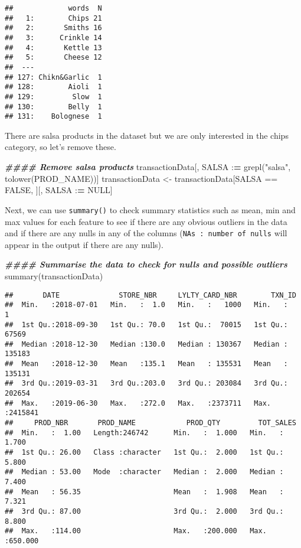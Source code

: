 \documentclass[
]{article}
\newenvironment{Shaded}{\begin{snugshade}}{\end{snugshade}}
\newcommand{\ConstantTok}[1]{\textcolor[rgb]{0.00,0.00,0.00}{#1}}
\newcommand{\DocumentationTok}[1]{\textcolor[rgb]{0.56,0.35,0.01}{\textbf{\textit{#1}}}}
\newcommand{\ErrorTok}[1]{\textcolor[rgb]{0.64,0.00,0.00}{\textbf{#1}}}
\newcommand{\FunctionTok}[1]{\textcolor[rgb]{0.00,0.00,0.00}{#1}}
\newcommand{\NormalTok}[1]{#1}
\newcommand{\OtherTok}[1]{\textcolor[rgb]{0.56,0.35,0.01}{#1}}
\newcommand{\SpecialCharTok}[1]{\textcolor[rgb]{0.00,0.00,0.00}{#1}}
\newcommand{\StringTok}[1]{\textcolor[rgb]{0.31,0.60,0.02}{#1}}
\begin{document}
\begin{verbatim}
##             words  N
##   1:        Chips 21
##   2:       Smiths 16
##   3:      Crinkle 14
##   4:       Kettle 13
##   5:       Cheese 12
##  ---                
## 127: Chikn&Garlic  1
## 128:        Aioli  1
## 129:         Slow  1
## 130:        Belly  1
## 131:    Bolognese  1
\end{verbatim}

There are salsa products in the dataset but we are only interested in
the chips category, so let's remove these.

\begin{Shaded}
\begin{Highlighting}[]
\DocumentationTok{\#\#\#\# Remove salsa products}
\NormalTok{transactionData[, SALSA }\SpecialCharTok{:}\ErrorTok{=} \FunctionTok{grepl}\NormalTok{(}\StringTok{"salsa"}\NormalTok{, }\FunctionTok{tolower}\NormalTok{(PROD\_NAME))]}
\NormalTok{transactionData }\OtherTok{\textless{}{-}}\NormalTok{ transactionData[SALSA }\SpecialCharTok{==} \ConstantTok{FALSE}\NormalTok{, ][, SALSA }\SpecialCharTok{:}\ErrorTok{=} \ConstantTok{NULL}\NormalTok{]}
\end{Highlighting}
\end{Shaded}

Next, we can use \texttt{summary()} to check summary statistics such as
mean, min and max values for each feature to see if there are any
obvious outliers in the data and if there are any nulls in any of the
columns (\texttt{NA\textquotesingle{}s\ :\ number\ of\ nulls} will
appear in the output if there are any nulls).

\begin{Shaded}
\begin{Highlighting}[]
\DocumentationTok{\#\#\#\# Summarise the data to check for nulls and possible outliers}
\FunctionTok{summary}\NormalTok{(transactionData)}
\end{Highlighting}
\end{Shaded}

\begin{verbatim}
##       DATE              STORE_NBR     LYLTY_CARD_NBR        TXN_ID       
##  Min.   :2018-07-01   Min.   :  1.0   Min.   :   1000   Min.   :      1  
##  1st Qu.:2018-09-30   1st Qu.: 70.0   1st Qu.:  70015   1st Qu.:  67569  
##  Median :2018-12-30   Median :130.0   Median : 130367   Median : 135183  
##  Mean   :2018-12-30   Mean   :135.1   Mean   : 135531   Mean   : 135131  
##  3rd Qu.:2019-03-31   3rd Qu.:203.0   3rd Qu.: 203084   3rd Qu.: 202654  
##  Max.   :2019-06-30   Max.   :272.0   Max.   :2373711   Max.   :2415841  
##     PROD_NBR       PROD_NAME            PROD_QTY         TOT_SALES      
##  Min.   :  1.00   Length:246742      Min.   :  1.000   Min.   :  1.700  
##  1st Qu.: 26.00   Class :character   1st Qu.:  2.000   1st Qu.:  5.800  
##  Median : 53.00   Mode  :character   Median :  2.000   Median :  7.400  
##  Mean   : 56.35                      Mean   :  1.908   Mean   :  7.321  
##  3rd Qu.: 87.00                      3rd Qu.:  2.000   3rd Qu.:  8.800  
##  Max.   :114.00                      Max.   :200.000   Max.   :650.000
\end{verbatim}
\end{document}
